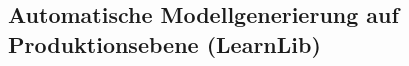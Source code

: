 \subsection{Automatische Modellgenerierung auf Produktionsebene (LearnLib)}









































